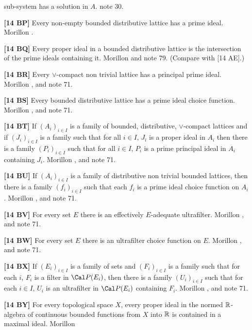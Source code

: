 sub-system has a solution in $A$. note 30.
\smallskip
\item{}{\bf [14 BP]} Every non-empty bounded distributive lattice has a
prime ideal.  \ac{Morillon} \cite{1988}.
\smallskip
\item{}{\bf [14 BQ]} Every proper ideal in a bounded distributive lattice
is the intersection of the prime ideals containing it. \ac{Morillon}
\cite{1988} and note 79. (Compare with [14 AE].)
\smallskip
\item{}{\bf [14 BR]}  Every $\lor$-compact non trivial lattice has a
principal prime ideal.  \ac{Morillon} \cite{1988}, \cite{1985} and note 71.
\smallskip
\item{}{\bf [14 BS]} Every bounded distributive lattice has a prime ideal
choice function.  \ac{Morillon} \cite{1988}, \cite{1985} and note 71.
\smallskip
\item{}{\bf [14 BT]} If $(A_i)_{i\in I}$ is a family of bounded,
distributive, $\lor$-compact lattices and if $(J_i)_{i\in I}$ is a family
such that for all $i\in I$, $J_i$ is a proper ideal in $A_i$ then there
is a family $(P_i)_{i\in I}$ such that for all $i\in I$, $P_i$ is a prime
principal ideal in $A_i$ containing $J_i$.  \ac{Morillon} \cite{1985},
\cite{1988} and note 71.
\smallskip
\item{}{\bf [14 BU]} If $(A_i)_{i\in I}$ is a family of distributive non
trivial bounded lattices, then there is a family $(f_i)_{i\in I}$ such that
each $f_i$ is a prime ideal choice function on $A_i$.  \ac{Morillon}
\cite{1985}, \cite{1988} and note 71.
\smallskip
\item{}{\bf [14 BV]} For every set $E$ there is an effectively
$E$-adequate ultrafilter.  \ac{Morillon} \cite{1988}, \cite{1985} and
note 71.
\smallskip
\item{}{\bf [14 BW]} For every set $E$ there is an ultrafilter choice
function on $E$.  \ac{Morillon} \cite{1985}, \cite{1988} and note 71.
\smallskip
\item{}{\bf [14 BX]} If $(E_i)_{i\in I}$ is a family of sets and $
(F_i)_{i\in I}$ is a family such that for each $i$, $F_i$ is a filter
in $\Cal P(E_i)$, then there is a family $(U_i)_{i\in I}$ such that for
each $i\in I$, $U_i$ is an ultrafilter in $\Cal P(E_i)$ containing $F_i$.
\ac{Morillon} \cite{1985}, \cite{1988} and note 71.
\smallskip
\item{}{\bf [14 BY]} For every topological space $X$, every proper ideal
in the normed ${\Bbb R}$-algebra of continuous bounded functions from
$X$ into $\Bbb R$ is contained in a maximal ideal. \ac{Morillon}
